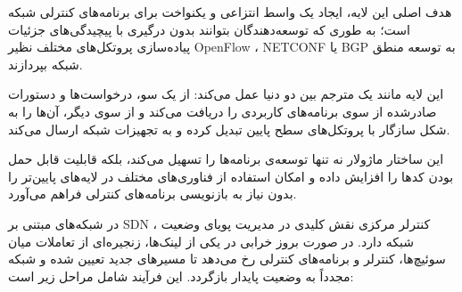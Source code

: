 هدف اصلی این لایه، ایجاد یک واسط انتزاعی و یکنواخت برای برنامه‌های کنترلی شبکه است؛ به‌ طوری‌ که توسعه‌دهندگان بتوانند بدون درگیری با پیچیدگی‌های جزئیات پیاده‌سازی پروتکل‌های مختلف نظیر OpenFlow ، NETCONF یا BGP به توسعه منطق شبکه بپردازند.

این لایه مانند یک مترجم بین دو دنیا عمل می‌کند: از یک سو، درخواست‌ها و دستورات صادرشده از سوی برنامه‌های کاربردی را دریافت می‌کند و از سوی دیگر، آن‌ها را به شکل سازگار با پروتکل‌های سطح پایین تبدیل کرده و به تجهیزات شبکه ارسال می‌کند. 

این ساختار ماژولار نه تنها توسعه‌ی برنامه‌ها را تسهیل می‌کند، بلکه قابلیت {قابل حمل بودن} کدها را افزایش داده و امکان استفاده از فناوری‌های مختلف در لایه‌های پایین‌تر را بدون نیاز به بازنویسی برنامه‌های کنترلی فراهم می‌آورد.




در شبکه‌های مبتنی بر {SDN} ، کنترلر مرکزی نقش کلیدی در مدیریت پویای وضعیت شبکه دارد. در صورت بروز خرابی در یکی از لینک‌ها، زنجیره‌ای از تعاملات میان سوئیچ‌ها، کنترلر و برنامه‌های کنترلی رخ می‌دهد تا مسیرهای جدید تعیین شده و شبکه مجدداً به وضعیت پایدار بازگردد. این فرآیند شامل مراحل زیر است:

